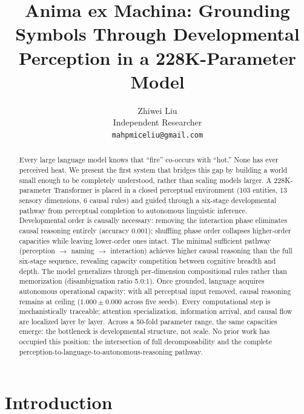 \documentclass{article}
\title{Anima ex Machina: Grounding Symbols Through Developmental Perception in a 228K-Parameter Model}
\author{
  Zhiwei Liu \\
  Independent Researcher \\
  \texttt{mahpmiceliu@gmail.com}
}
\begin{document}
\maketitle

\begin{abstract}
Every large language model knows that ``fire'' co-occurs with ``hot.'' None has ever perceived heat. We present the first system that bridges this gap by building a world small enough to be completely understood, rather than scaling models larger. A 228K-parameter Transformer is placed in a closed perceptual environment (103 entities, 13 sensory dimensions, 6 causal rules) and guided through a six-stage developmental pathway from perceptual completion to autonomous linguistic inference. Developmental order is causally necessary: removing the interaction phase eliminates causal reasoning entirely (accuracy 0.001); shuffling phase order collapses higher-order capacities while leaving lower-order ones intact. The minimal sufficient pathway (perception $\rightarrow$ naming $\rightarrow$ interaction) achieves higher causal reasoning than the full six-stage sequence, revealing capacity competition between cognitive breadth and depth. The model generalizes through per-dimension compositional rules rather than memorization (disambiguation ratio 5.0:1). Once grounded, language acquires autonomous operational capacity: with all perceptual input removed, causal reasoning remains at ceiling ($1.000 \pm 0.000$ across five seeds). Every computational step is mechanistically traceable; attention specialization, information arrival, and causal flow are localized layer by layer. Across a 50-fold parameter range, the same capacities emerge: the bottleneck is developmental structure, not scale. No prior work has occupied this position: the intersection of full decomposability and the complete perception-to-language-to-autonomous-reasoning pathway.
\end{abstract}

\section{Introduction}
\end{document}
